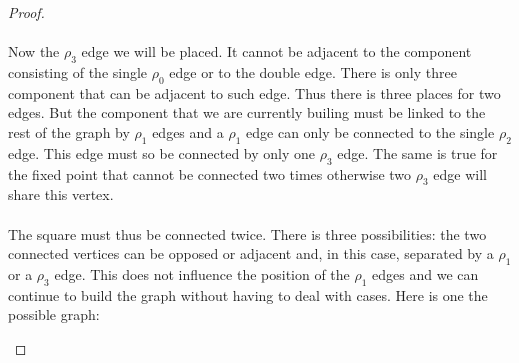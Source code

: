 \begin{proof}
\paragraph{}
Now the $\rho_3$ edge we will be placed. It cannot be adjacent to the component consisting of the single $\rho_0$ edge or to the double edge. There is only three component that can be adjacent to such edge. Thus there is three places for two edges. But the component that we are currently builing must be linked to the rest of the graph by $\rho_1$ edges and a $\rho_1$ edge can only be connected to the single $\rho_2$ edge. This edge must so be connected by only one $\rho_3$ edge. The same is true for the fixed point that cannot be connected two times otherwise two $\rho_3$ edge will share this vertex.

\paragraph{}
The square must thus be connected twice. There is three possibilities: the two connected vertices can be opposed or adjacent and, in this case, separated by a $\rho_1$ or a $\rho_3$ edge. This does not influence the position of the $\rho_1$ edges and we can continue to build the graph without having to deal with cases. Here is one the possible graph:

\begin{figure}[H]
  \begin{center}
\end{center}
\end{figure}
\end{proof}
